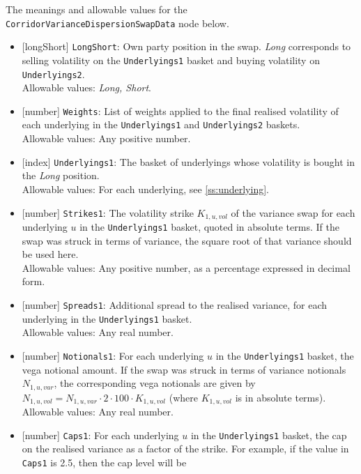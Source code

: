 The meanings and allowable values for the \lstinline!CorridorVarianceDispersionSwapData! node below.

\begin{itemize}
  \item{}[longShort] \lstinline!LongShort!: Own party position in the swap. \emph{Long} corresponds to selling volatility on
  the \lstinline!Underlyings1! basket and buying volatility on \lstinline!Underlyings2!. \\
  Allowable values: \emph{Long, Short}.
  \item{}[number] \lstinline!Weights!: List of weights applied to the final realised volatility of each underlying
  in the \lstinline!Underlyings1! and \lstinline!Underlyings2! baskets. \\
  Allowable values: Any positive number.
  \item{}[index] \lstinline!Underlyings1!: The basket of underlyings whose volatility is bought in the \emph{Long} position. \\
  Allowable values: For each underlying, see \ref{ss:underlying}.
  \item{}[number] \lstinline!Strikes1!: The volatility strike $K_{1,u,vol}$ of the variance swap for each underlying $u$
  in the \lstinline!Underlyings1! basket, quoted in absolute terms. If the swap was
  struck in terms of variance, the square root of that variance should be used here.\\
  Allowable values: Any positive number, as a percentage expressed in decimal form.
  \item{}[number] \lstinline!Spreads1!: Additional spread to the realised variance, for each underlying in the
  \lstinline!Underlyings1! basket. \\
  Allowable values: Any real number.
  \item{}[number] \lstinline!Notionals1!: For each underlying $u$ in the \lstinline!Underlyings1! basket, the vega notional amount.
  If the swap was struck in terms of variance notionals $N_{1,u,var}$, the corresponding vega notionals are given by
  $N_{1,u,vol} = N_{1,u,var} \cdot 2 \cdot 100 \cdot K_{1,u,vol}$ (where $K_{1,u,vol}$ is in
  absolute terms). \\
  Allowable values: Any real number.
  \item{}[number] \lstinline!Caps1!: For each underlying $u$ in the \lstinline!Underlyings1! basket, the cap on the realised variance
  as a factor of the strike. For example, if the value in \lstinline!Caps1! is 2.5, then the cap level will be

\end{itemize}

